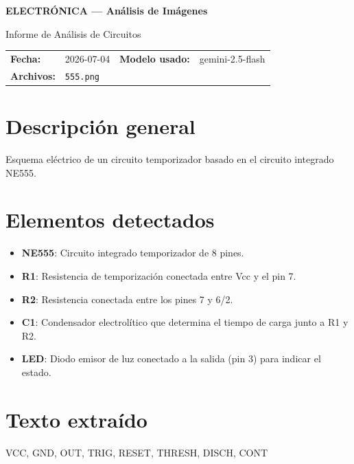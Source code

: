 \documentclass[11pt,a4paper]{article}
\newcommand{\bandaTitulo}[2]{%
  \begin{tcolorbox}[enhanced, colback=bandaAzul, colframe=bandaAzul,
    boxrule=0pt, arc=0pt, outer arc=0pt, width=\linewidth,
    halign=center, valign=center,
    top=14pt, bottom=14pt, left=10pt, right=10pt]
    {\LARGE\bfseries\color{white}#1}\par\vspace{4pt}%
    {\small\color{white!78!black}#2}%
  \end{tcolorbox}\vspace{8pt}}
\begin{document}
\bandaTitulo{ELECTRÓNICA --- Análisis de Imágenes}{Informe de Análisis de Circuitos}

\vspace{4pt}
\begin{tcolorbox}[tarjetaIcono, title={\faIcon{image} ~Datos del análisis}]
\begin{tabular}{@{}llll@{}}
  \textbf{Fecha:}       & 2026-07-04  &
  \textbf{Modelo usado:} & gemini-2.5-flash \\[4pt]
  \textbf{Archivos:}    & \multicolumn{3}{l}{\texttt{555.png}} \\
\end{tabular}
\end{tcolorbox}

\section*{Descripción general}
Esquema eléctrico de un circuito temporizador basado en el circuito integrado NE555.

\section*{Elementos detectados}
\begin{itemize}[leftmargin=1.5em, itemsep=2pt]
  \item \textbf{NE555}: Circuito integrado temporizador de 8 pines.
  \item \textbf{R1}: Resistencia de temporización conectada entre Vcc y el pin 7.
  \item \textbf{R2}: Resistencia conectada entre los pines 7 y 6/2.
  \item \textbf{C1}: Condensador electrolítico que determina el tiempo de carga junto a R1 y R2.
  \item \textbf{LED}: Diodo emisor de luz conectado a la salida (pin 3) para indicar el estado.
\end{itemize}

\section*{Texto extraído}
VCC, GND, OUT, TRIG, RESET, THRESH, DISCH, CONT
\end{document}
